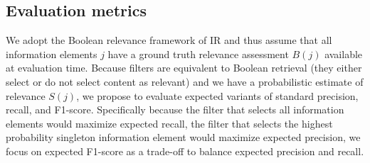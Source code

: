 





\subsection{Evaluation metrics}

We adopt the Boolean relevance framework of IR and thus assume that all information elements $j$ have a ground truth relevance assessment $B(j)$ available at evaluation time.  
Because filters are equivalent to Boolean retrieval (they either select or do not select content as relevant) and we have a probabilistic estimate of relevance $S(j)$, we propose to evaluate
expected variants of standard precision, recall, and F1-score.
Specifically because the filter that selects all information elements would maximize expected recall, the filter that selects the highest probability singleton information element would maximize expected precision, we focus on expected F1-score as a trade-off to balance expected precision and recall.

